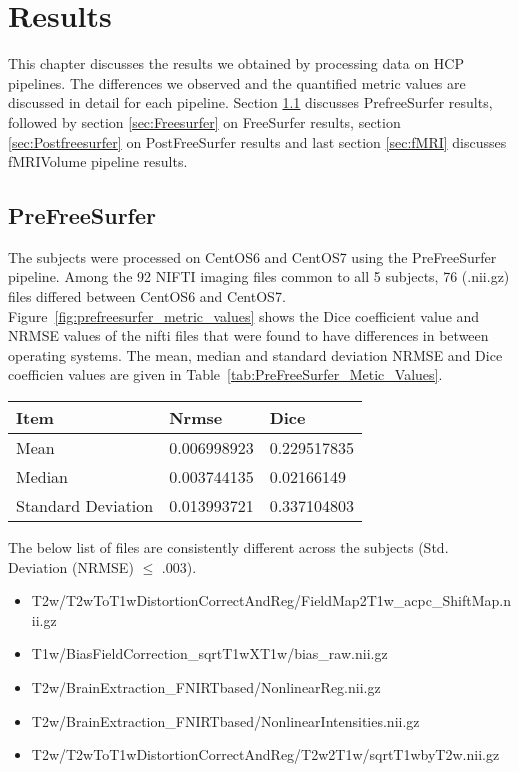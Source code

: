 \chapter{Results}
This chapter discusses the results we obtained by processing data on HCP pipelines. The differences we observed and the quantified metric values are discussed in detail for each pipeline. Section \ref{sec:Prefreesurfer} discusses PrefreeSurfer results, followed by section \ref{sec:Freesurfer} on FreeSurfer results, section \ref{sec:Postfreesurfer} on PostFreeSurfer results and last section \ref{sec:fMRI} discusses fMRIVolume pipeline results.

\section{PreFreeSurfer} \label{sec:Prefreesurfer}
The subjects were processed on CentOS6 and CentOS7 using the PreFreeSurfer pipeline. Among the 92 NIFTI imaging files common to all 5 subjects, 76 (.nii.gz) files differed between CentOS6 and CentOS7. Figure~\ref{fig:prefreesurfer_metric_values} shows the Dice coefficient value and NRMSE values of the nifti files that were found to have differences in between operating systems. The mean, median and standard deviation NRMSE and Dice coefficien values are given in Table~\ref{tab:PreFreeSurfer_Metic_Values}.

\hfill \break
\begin{center}
\begin{tabular}{|l|l|l|}
\hline
\textbf{Item}      & \textbf{Nrmse} & \textbf{Dice} \\ \hline
Mean               & 0.006998923    & 0.229517835   \\ \hline
Median             & 0.003744135    & 0.02166149    \\ \hline
Standard Deviation & 0.013993721    & 0.337104803   \\ \hline
\end{tabular}
\label{tab:PreFreeSurfer_Metic_Values}
\end{center}
\hfill \break
The below list of files  are consistently different across the subjects (Std. Deviation (NRMSE) $\leq$ .003).
\begin{itemize} 
  \item T2w/T2wToT1wDistortionCorrectAndReg/FieldMap2T1w\_acpc\_ShiftMap.nii.gz
  \item T1w/BiasFieldCorrection\_sqrtT1wXT1w/bias\_raw.nii.gz
  \item T2w/BrainExtraction\_FNIRTbased/NonlinearReg.nii.gz
  \item T2w/BrainExtraction\_FNIRTbased/NonlinearIntensities.nii.gz
  \item T2w/T2wToT1wDistortionCorrectAndReg/T2w2T1w/sqrtT1wbyT2w.nii.gz
\end{itemize}

